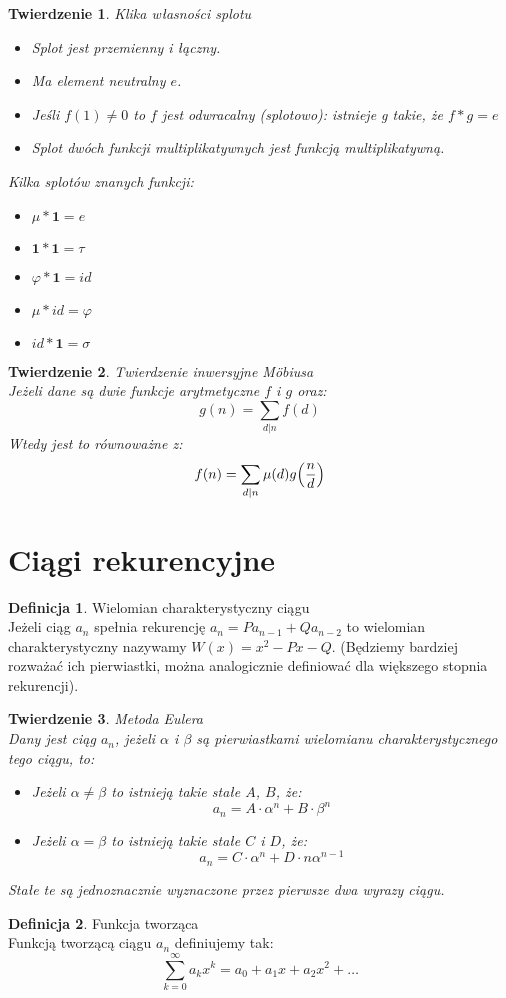 \documentclass[10pt,a4paper]{article}
\theoremstyle{plain}
\newtheorem{thm}{Twierdzenie}[section]
\theoremstyle{definition}
\newtheorem{defi}{Definicja}[section]
\theoremstyle{remark}
\newcommand{\q}{\textbf{1}}
\begin{document}
	\begin{thm}{Klika własności splotu}
		\begin{itemize}
			\item Splot jest przemienny i łączny.
			\item Ma element neutralny $e$.
			\item Jeśli $f(1) \neq 0$ to $f$ jest odwracalny (splotowo): istnieje g takie, że $f*g=e$
			\item Splot dwóch funkcji multiplikatywnych jest funkcją multiplikatywną.
		\end{itemize}
		Kilka splotów znanych funkcji:
		\begin{itemize}
			\item $\mu * \q = e$
			\item $\q * \q = \tau$
			\item $\varphi * \q = id$
			\item $\mu * id = \varphi$
			\item $id * \q = \sigma$
		\end{itemize}
	\end{thm}
	\begin{thm}{Twierdzenie inwersyjne Möbiusa}
		\\ 
		Jeżeli dane są dwie funkcje arytmetyczne $f$ i $g$ oraz:
		$$g(n)=\sum_{d|n}f(d)$$
		Wtedy jest to równoważne z:
		$$f(n)=\sum_{d|n}\mu(d)g\Bigl(\frac{n}{d}\Bigr)$$
	\end{thm}
	\section{Ciągi rekurencyjne}
	\begin{defi}{Wielomian charakterystyczny ciągu}
		\\ 
		\color{black}
		Jeżeli ciąg $a_n$ spełnia rekurencję $a_n=Pa_{n-1}+Qa_{n-2}$ to wielomian charakterystyczny nazywamy $W(x)=x^2-Px-Q$. (Będziemy bardziej rozważać ich pierwiastki, można analogicznie definiować dla większego stopnia rekurencji).
	\end{defi}
	\begin{thm}{Metoda Eulera}
		\\ 
		Dany jest ciąg $a_n$, jeżeli $\alpha$ i $\beta$ są pierwiastkami wielomianu charakterystycznego tego ciągu, to: 
		\begin{itemize}
			\item Jeżeli $\alpha \neq \beta$ to istnieją takie stałe $A$, $B$, że: $$a_n=A\cdot \alpha^n+B\cdot \beta^n$$
			\item Jeżeli $\alpha=\beta$ to istnieją takie stałe $C$ i $D$, że:
			$$a_n=C\cdot \alpha^n+D\cdot n\alpha^{n-1}$$ 
		\end{itemize}
		Stałe te są jednoznacznie wyznaczone przez pierwsze dwa wyrazy ciągu.
	\end{thm}
	\begin{defi}{Funkcja tworząca}
		\\
		Funkcją tworzącą ciągu $a_n$ definiujemy tak:
		$$\sum_{k=0}^{\infty} a_kx^k= a_0+a_1x+a_2x^2+\ldots$$
	\end{defi}
	
\end{document}
